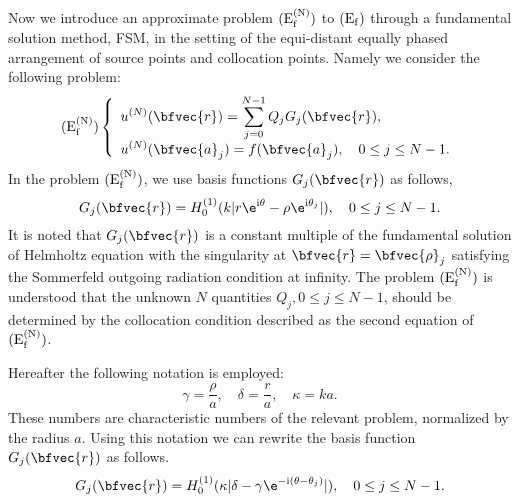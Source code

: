 Now we introduce an approximate problem ${\rm (E^{(N)}_f)}$ to ${\rm (E_f)}$ through a fundamental solution method, FSM, in the setting of the equi-distant equally phased arrangement of source points and collocation points. Namely we consider the following problem:  
\begin{eqnarray*}
{\rm (E^{(N)}_f)}
\left\{
\begin{array}{l}
\displaystyle u^{(N)}(\bfvec{r})=\sum^{N-1}_{j=0} Q_j G_j(\bfvec{r}),\\
\displaystyle u^{(N)}(\bfvec{a}_j)=f(\bfvec{a}_j), \quad 0 \leq j \leq N-1.
\end{array}
\right.
\nonumber
\end{eqnarray*}
In the problem ${\rm (E^{(N)}_f)}$, we use basis functions $G_j({\bfvec{r}})$ as follows, 
\begin{displaymath}
G_j({\bfvec{r}}) = H_0^{(1)}(k|r\e^{\mathrm{i}{\theta}}- \rho \e^{\mathrm{i}{\theta}_j}|) ,
\quad 0 \leq j \leq N-1.
\end{displaymath}
It is noted that $G_j({\bfvec{r}})$ is a constant multiple of the fundamental solution of Helmholtz equation with the singularity at $\bfvec{r}=\bfvec{\rho}_j$ satisfying the Sommerfeld outgoing radiation condition at infinity. The problem ${\rm (E^{(N)}_f)}$ is understood that the unknown $N$ quantities $Q_j, 0\le j \le N-1$, should be determined by the collocation condition described as the second equation of ${\rm (E^{(N)}_f)}$.

Hereafter the following notation is employed:
\begin{displaymath}
\gamma = \frac{\rho}{a}, \quad 
\delta = \frac{r}{a}, \quad 
\kappa = ka.
\end{displaymath}
These numbers are characteristic numbers of the relevant problem, normalized by the radius $a$.
Using this notation we can rewrite the basis function $G_j({\bfvec{r}})$ as follows.
\begin{displaymath}
G_j({\bfvec{r}}) = H_0^{(1)}(\kappa|\delta- \gamma \e^{-\mathrm{i}(\theta -{\theta}_j)}|) ,
\quad 0 \leq j \leq N-1.
\end{displaymath}

